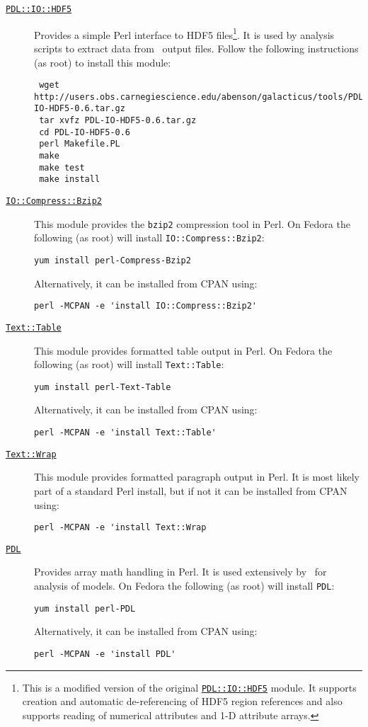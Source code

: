 \begin{description}
\item [\href{http://users.obs.carnegiescience.edu/abenson/galacticus/tools/PDL-IO-HDF5-0.6.tar.gz}{{\tt PDL::IO::HDF5}}] Provides a simple Perl interface to HDF5 files\footnote{This is a modified version of the  original \protect\href{http://search.cpan.org/~cerney/PDL-IO-HDF5-0.63/}{{\tt PDL::IO::HDF5}} module. It supports creation and automatic de-referencing of HDF5 region references and also supports reading of numerical attributes and 1-D attribute arrays.}. It is used by analysis scripts to extract data from \glc\ output files. Follow the following instructions (as root) to install this module:
\begin{verbatim}
 wget http://users.obs.carnegiescience.edu/abenson/galacticus/tools/PDL-IO-HDF5-0.6.tar.gz
 tar xvfz PDL-IO-HDF5-0.6.tar.gz
 cd PDL-IO-HDF5-0.6
 perl Makefile.PL
 make
 make test
 make install
\end{verbatim}

  \item [\href{http://perldoc.perl.org/IO/Compress/Bzip2.html}{{\tt IO::Compress::Bzip2}}] This module provides the {\tt bzip2} compression tool in Perl. On Fedora the following (as root) will install {\tt IO::Compress::Bzip2}:
\begin{verbatim}
yum install perl-Compress-Bzip2
\end{verbatim}
Alternatively, it can be installed from CPAN using:
\begin{verbatim}
perl -MCPAN -e 'install IO::Compress::Bzip2'
\end{verbatim}
  \item [\href{http://search.cpan.org/~anno/Text-Table-1.114/lib/Text/Table.pm}{{\tt Text::Table}}] This module provides formatted table output in Perl. On Fedora the following (as root) will install {\tt Text::Table}:
\begin{verbatim}
yum install perl-Text-Table
\end{verbatim}
Alternatively, it can be installed from CPAN using:
\begin{verbatim}
perl -MCPAN -e 'install Text::Table'
\end{verbatim}
  \item [\href{http://search.cpan.org/~jhi/perl-5.8.0/lib/Text/Wrap.pm}{{\tt Text::Wrap}}] This module provides formatted paragraph output in Perl. It is most likely part of a standard Perl install, but if not it can be installed from CPAN using:
\begin{verbatim}
perl -MCPAN -e 'install Text::Wrap
\end{verbatim}
\item [\href{http://pdl.perl.org/}{{\tt PDL}}] Provides array math handling in Perl. It is used extensively by \glc\ for analysis of models. On Fedora the following (as root) will install {\tt PDL}:
\begin{verbatim}
yum install perl-PDL
\end{verbatim}
Alternatively, it can be installed from CPAN using:
\begin{verbatim}
perl -MCPAN -e 'install PDL'
\end{verbatim}


\end{description}
